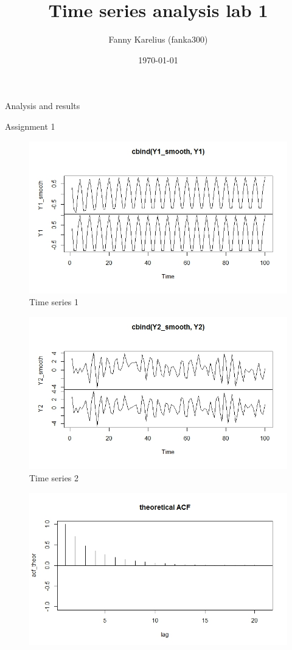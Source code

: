 \documentclass{article}
\title{Time series analysis lab 1}
\author{Fanny Karelius (fanka300)}
\date{\today}
\begin{document}
\maketitle

\begin{section}{Analysis and results}
\begin{subsection}{Assignment 1}
\begin{figure}[ht!]
    \centering
    \includegraphics[scale=0.4]{cbindY1}
    \caption{Time series 1}
    \label{fig:ts1}
\end{figure}
\begin{figure}[ht!]
    \centering
    \includegraphics[scale=0.4]{cbindY2}
    \caption{Time series 2}
    \label{fig:ts2}
\end{figure}
\begin{figure}[ht!]
    \centering
    \includegraphics[scale=0.4]{acfTheo}

\end{figure}
\end{subsection}
\end{section}
\end{document}
